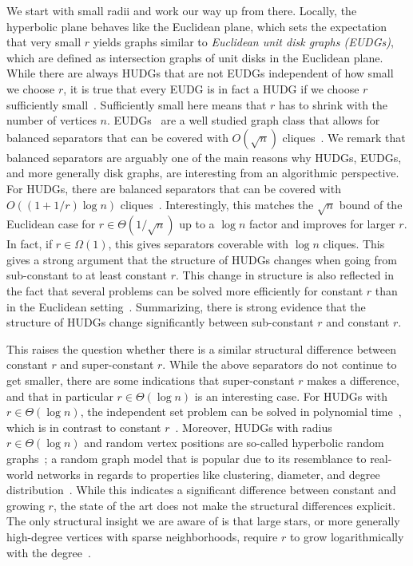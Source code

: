 \documentclass[a4paper,english,cleveref,thm-restate]{lipics-v2021}
\begin{document}
We start with small radii and work our way up from there.
Locally, the hyperbolic plane behaves like the Euclidean plane, which sets the expectation that very small $r$ yields graphs similar to \emph{Euclidean unit disk graphs (EUDGs)}, which are defined as intersection graphs of unit disks in the Euclidean plane.
While there are always HUDGs that are not EUDGs independent of how small we choose $r$, it is true that every EUDG is in fact a HUDG if we choose $r$ sufficiently small~\cite{blasius_strongly_2023}.
Sufficiently small here means that $r$ has to shrink with the number of vertices $n$.
EUDGs~\cite{clark_unit_1990} are a well studied graph class that allows for balanced separators that can be covered with $ O(\sqrt{n}) $ cliques~\cite{Framew_Expon_Time_Hypot-Berg20}.
We remark that balanced separators are arguably one of the main reasons why HUDGs, EUDGs, and more generally disk graphs, are interesting from an algorithmic perspective.
For HUDGs, there are balanced separators that can be covered with $ O((1 + 1/r) \log n) $ cliques~\cite{Struc_Indep_Hyper_Unifor_Disk_Graph-Blaesius25}.
Interestingly, this matches the $\sqrt{n}$ bound of the Euclidean case for $r \in \Theta(1/\sqrt{n})$ up to a $\log n$ factor and improves for larger $r$.
In fact, if $r \in \Omega(1)$, this gives separators coverable with $\log n$ cliques.
This gives a strong argument that the structure of HUDGs changes when going from sub-constant to at least constant $r$.
This change in structure is also reflected in the fact that several problems can be solved more efficiently for constant $r$ than in the Euclidean setting~\cite{kisfaludi_hyperbolic_2019,Struc_Indep_Hyper_Unifor_Disk_Graph-Blaesius25}.
Summarizing, there is strong evidence that the structure of HUDGs change significantly between sub-constant $r$ and constant $r$.

This raises the question whether there is a similar structural difference between constant $r$ and super-constant $r$.
While the above separators do not continue to get smaller, there are some indications that super-constant $r$ makes a difference, and that in particular $r \in \Theta(\log n)$ is an interesting case.
For HUDGs with $r \in \Theta(\log n)$, the independent set problem can be solved in polynomial time~\cite{Struc_Indep_Hyper_Unifor_Disk_Graph-Blaesius25}, which is in contrast to constant $r$~\cite{kisfaludi_hyperbolic_2019}.
Moreover, HUDGs with radius $r \in \Theta(\log n)$ and random vertex positions are so-called hyperbolic random graphs~\cite{krioukov_hyperbolic_2010}; a random graph model that is popular due to its resemblance to real-world networks in regards to properties like clustering, diameter, and degree distribution~\cite{friedrich_diameter_2018,friedrich_diameter_2018_conf,Random_Hyper_Graph-Gugel12}.
While this indicates a significant difference between constant and growing $r$, the state of the art does not make the structural differences explicit.
The only structural insight we are aware of is that large stars, or more generally high-degree vertices with sparse neighborhoods, require $r$ to grow logarithmically with the degree~\cite{blasius_strongly_2023}.
\end{document}
